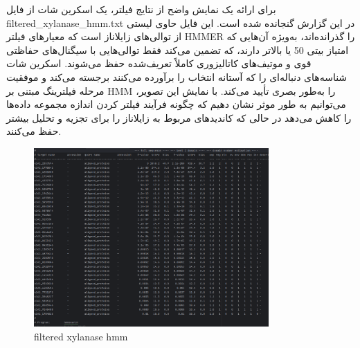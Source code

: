                 برای ارائه یک نمایش واضح از نتایج فیلتر، یک اسکرین شات از فایل 
                filtered\_xylanase\_hmm.txt 
                در این گزارش گنجانده شده است. این فایل حاوی لیستی از توالی‌های زایلاناز است که معیارهای فیلتر 
                HMMER 
                را گذرانده‌اند، به‌ویژه آن‌هایی که امتیاز بیتی 50 یا بالاتر دارند، که تضمین می‌کند فقط توالی‌هایی با سیگنال‌های حفاظتی قوی و موتیف‌های کاتالیزوری کاملاً تعریف‌شده حفظ می‌شوند. اسکرین شات شناسه‌های دنباله‌ای را که آستانه انتخاب را برآورده می‌کنند برجسته می‌کند و موفقیت مرحله فیلترینگ مبتنی بر 
                HMM 
                را به‌طور بصری تأیید می‌کند. با نمایش این تصویر، می‌توانیم به طور موثر نشان دهیم که چگونه فرآیند فیلتر کردن اندازه مجموعه داده‌ها را کاهش می‌دهد در حالی که کاندیدهای مربوط به زایلاناز را برای تجزیه و تحلیل بیشتر حفظ می‌کنند.
                \begin{figure}[H]
                    \centering
                    \includegraphics[width=0.8\textwidth]{images/filtered_xylanase_hmm.txt .png} %
                    \caption{filtered xylanase hmm }
                    \label{fig:filtered_xylanase_hmm.txt }
                \end{figure}